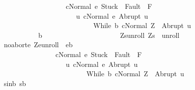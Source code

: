 \begin{isabellebody}
\ \ \ \ \ \ \ \ \ \ \ \ \ \ \ \ \ \ \ \ \ \ \ \ \ \ \ {\isasymlongrightarrow}\ {\isasymGamma}{\isasymturnstile}{\isasymlangle}c{\isacharcomma}Normal\ e{\isasymrangle}\ {\isasymRightarrow}{\isasymnotin}{\isacharparenleft}{\isacharbraceleft}Stuck{\isacharbraceright}\ {\isasymunion}\ Fault\ {\isacharbackquote}\ {\isacharparenleft}{\isacharminus}F{\isacharparenright}{\isacharparenright}\ {\isasymand}\ \isanewline
\ \ \ \ \ \ \ \ \ \ \ \ \ \ \ \ \ \ \ \ \ \ \ \ \ \ \ \ \ \ \ {\isacharparenleft}{\isasymforall}u{\isachardot}\ {\isasymGamma}{\isasymturnstile}{\isasymlangle}c{\isacharcomma}Normal\ e{\isasymrangle}\ {\isasymRightarrow}Abrupt\ u\ {\isasymlongrightarrow}\ \isanewline
\ \ \ \ \ \ \ \ \ \ \ \ \ \ \ \ \ \ \ \ \ \ \ \ \ \ \ \ \ \ \ \ \ \ \ \ {\isasymGamma}{\isasymturnstile}{\isasymlangle}While\ b\ c{\isacharcomma}Normal\ Z{\isasymrangle}\ {\isasymRightarrow}\ Abrupt\ u{\isacharparenright}{\isacharparenright}{\isacharbraceright}\isanewline
\ \ \ \ \ \ \ \ \ \ \ \ \ \ \ \ \ \ \ {\isasyminter}\ b{\isachardoublequoteclose}\isanewline
\ \ \ \ \ \ \ \ \isamarkupfalse%
\ \isamarkupfalse%
\ \isanewline
\ \ \ \ \ \ \ \ \ \ Z{\isacharunderscore}s{\isacharunderscore}unroll{\isacharcolon}\ {\isachardoublequoteopen}{\isacharparenleft}Z{\isacharcomma}s{\isacharparenright}\ {\isasymin}\ {\isacharquery}unroll{\isachardoublequoteclose}\ \isanewline
\ \ \ \ \ \ \ \ \ \ noabort{\isacharcolon}{\isachardoublequoteopen}{\isasymforall}e{\isachardot}\ {\isacharparenleft}Z{\isacharcomma}e{\isacharparenright}{\isasymin}{\isacharquery}unroll\ {\isasymlongrightarrow}\ e{\isasymin}b\isanewline
\ \ \ \ \ \ \ \ \ \ \ \ \ \ \ \ \ \ \ \ \ \ \ \ {\isasymlongrightarrow}\ {\isasymGamma}{\isasymturnstile}{\isasymlangle}c{\isacharcomma}Normal\ e{\isasymrangle}\ {\isasymRightarrow}{\isasymnotin}{\isacharparenleft}{\isacharbraceleft}Stuck{\isacharbraceright}\ {\isasymunion}\ Fault\ {\isacharbackquote}\ {\isacharparenleft}{\isacharminus}F{\isacharparenright}{\isacharparenright}\ {\isasymand}\ \isanewline
\ \ \ \ \ \ \ \ \ \ \ \ \ \ \ \ \ \ \ \ \ \ \ \ \ \ \ \ {\isacharparenleft}{\isasymforall}u{\isachardot}\ {\isasymGamma}{\isasymturnstile}{\isasymlangle}c{\isacharcomma}Normal\ e{\isasymrangle}\ {\isasymRightarrow}Abrupt\ u\ {\isasymlongrightarrow}\ \isanewline
\ \ \ \ \ \ \ \ \ \ \ \ \ \ \ \ \ \ \ \ \ \ \ \ \ \ \ \ \ \ \ \ \ \ {\isasymGamma}{\isasymturnstile}{\isasymlangle}While\ b\ c{\isacharcomma}Normal\ Z{\isasymrangle}\ {\isasymRightarrow}\ Abrupt\ u{\isacharparenright}{\isachardoublequoteclose}\ \isanewline
\ \ \ \ \ \ \ \ \ \ s{\isacharunderscore}in{\isacharunderscore}b{\isacharcolon}\ {\isachardoublequoteopen}s{\isasymin}b{\isachardoublequoteclose}\ \isanewline

\end{isabellebody}

